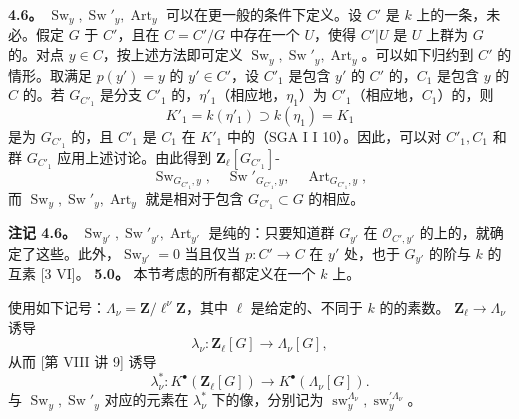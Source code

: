 \textbf{4.6。}  $\operatorname{Sw}_y,\operatorname{Sw}'_y,\operatorname{Art}_y$ 可以在更一般的条件下定义。设 $C'$ 是 $k$ 上的一条，未必。假定 $G$ 于 $C'$，且在 $C=C'/G$ 中存在一个 $U$，使得 $C'|U$ 是 $U$ 上群为 $G$ 的。对点 $y\in C$，按上述方法即可定义 $\operatorname{Sw}_y,\operatorname{Sw}'_y,\operatorname{Art}_y$。可以如下归约到 $C'$ 的情形。取满足 $p(y')=y$ 的 $y'\in C'$，设 $C'_1$ 是包含 $y'$ 的 $C'$ 的，$C_1$ 是包含 $y$ 的 $C$ 的。若 $G_{C'_1}$ 是分支 $C'_1$ 的，$\eta'_1$（相应地，$\eta_1$）为 $C'_1$（相应地，$C_1$）的，则
\[
K'_1=k(\eta'_1)\supset k(\eta_1)=K_1
\]
是为 $G_{C'_1}$ 的，且 $C'_1$ 是 $C_1$ 在 $K'_1$ 中的（SGA I I 10）。因此，可以对 $C'_1,C_1$ 和群 $G_{C'_1}$ 应用上述讨论。由此得到 $\mathbf Z_\ell[G_{C'_1}]$-
\[
\operatorname{Sw}_{G_{C'_1},y},\quad
\operatorname{Sw}'_{G_{C'_1},y},\quad
\operatorname{Art}_{G_{C'_1},y},
\]
而 $\operatorname{Sw}_y,\operatorname{Sw}'_y,\operatorname{Art}_y$ 就是相对于包含 $G_{C'_1}\subset G$ 的相应。

\textbf{注记 4.6。}  $\operatorname{Sw}_{y'},\operatorname{Sw}'_{y'},\operatorname{Art}_{y'}$ 是纯的：只要知道群 $G_{y'}$ 在 $\mathscr O_{C',y'}$ 的上的，就确定了这些。此外，$\operatorname{Sw}_{y'}=0$ 当且仅当 $p:C'\longrightarrow C$ 在 $y'$ 处，也于 $G_{y'}$ 的阶与 $k$ 的互素 [3 VI]。
\textbf{5.0。} 本节考虑的所有都定义在一个 $k$ 上。

使用如下记号：$\Lambda_\nu=\mathbf Z/\ell^\nu\mathbf Z$，其中 $\ell$ 是给定的、不同于 $k$ 的的素数。 $\mathbf Z_\ell\longrightarrow\Lambda_\nu$ 诱导
\[
\lambda_\nu:\mathbf Z_\ell[G]\longrightarrow\Lambda_\nu[G],
\]
从而 [第 VIII 讲 9] 诱导
\[
\lambda_\nu^*:K^\bullet(\mathbf Z_\ell[G])\longrightarrow K^\bullet(\Lambda_\nu[G]).
\]
与 $\operatorname{Sw}_y,\operatorname{Sw}'_y$ 对应的元素在 $\lambda_\nu^*$ 下的像，分别记为 $\operatorname{sw}_y^{\Lambda_\nu},\operatorname{sw}_y^{\prime\Lambda_\nu}$。

